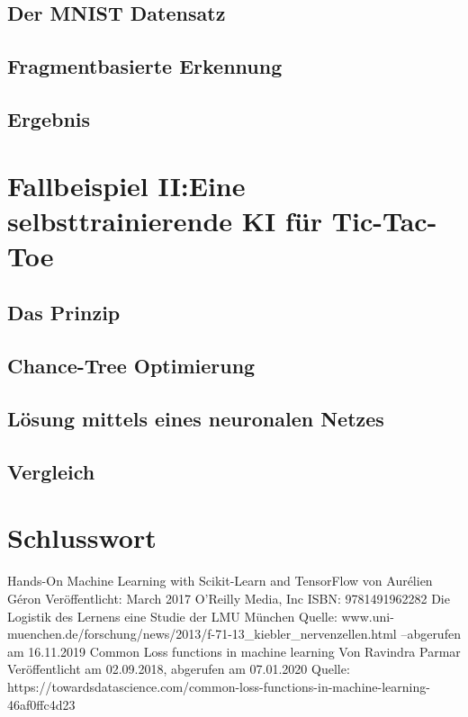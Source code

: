 \documentclass{article}
\begin{document}
\subsection{Der MNIST Datensatz}
\subsection{Fragmentbasierte Erkennung}
\subsection{Ergebnis}
\section{Fallbeispiel II:\newline Eine selbsttrainierende KI für Tic-Tac-Toe}
\subsection{Das Prinzip}
\subsection{Chance-Tree Optimierung}
\subsection{Lösung mittels eines neuronalen Netzes}
\subsection{Vergleich}
\section{Schlusswort}
\newpage
\begin{thebibliography}{99}
	Hands-On Machine Learning with Scikit-Learn and TensorFlow\newline
	von Aurélien Géron\newline
	Veröffentlicht: March 2017 O'Reilly Media, Inc\newline
	ISBN: 9781491962282
	Die Logistik des Lernens eine Studie der LMU München\newline
	Quelle: www.uni-muenchen.de/forschung/news/2013/\newline f-71-13\_kiebler\_nervenzellen.html --abgerufen am 16.11.2019
	Common Loss functions in machine learning\newline
	Von Ravindra Parmar\newline
	Veröffentlicht am 02.09.2018, abgerufen am 07.01.2020\newline
	Quelle: https://towardsdatascience.com/common-loss-functions-in-machine-learning-46af0ffc4d23 
	
\end{thebibliography}
\listoffigures
\end{document}
